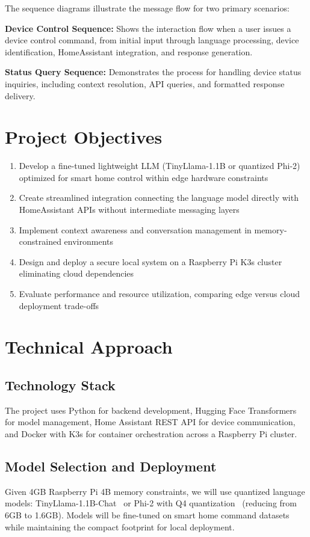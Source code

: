 \documentclass[12pt]{article}
\begin{document}
The sequence diagrams illustrate the message flow for two primary scenarios:

\textbf{Device Control Sequence:} Shows the interaction flow when a user issues a device control command, from initial input through language processing, device identification, HomeAssistant integration, and response generation.

\textbf{Status Query Sequence:} Demonstrates the process for handling device status inquiries, including context resolution, API queries, and formatted response delivery.

\section{Project Objectives}

\begin{enumerate}
\item Develop a fine-tuned lightweight LLM (TinyLlama-1.1B or quantized Phi-2) optimized for smart home control within edge hardware constraints
\item Create streamlined integration connecting the language model directly with HomeAssistant APIs without intermediate messaging layers
\item Implement context awareness and conversation management in memory-constrained environments
\item Design and deploy a secure local system on a Raspberry Pi K3s cluster eliminating cloud dependencies
\item Evaluate performance and resource utilization, comparing edge versus cloud deployment trade-offs
\end{enumerate}

\section{Technical Approach}

\subsection{Technology Stack}
The project uses Python for backend development, Hugging Face Transformers for model management, Home Assistant REST API for device communication, and Docker with K3s for container orchestration across a Raspberry Pi cluster.

\subsection{Model Selection and Deployment}
Given 4GB Raspberry Pi 4B memory constraints, we will use quantized language models: TinyLlama-1.1B-Chat~\cite{zhang2023tinyllama} or Phi-2 with Q4 quantization~\cite{gunasekara2023textbooks} (reducing from 6GB to 1.6GB). Models will be fine-tuned on smart home command datasets while maintaining the compact footprint for local deployment.
\end{document}

